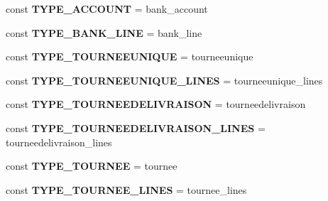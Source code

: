 \begin{DoxyCompactItemize}
\item 
\mbox{\label{classCategorie_a8236dc4a2c1114ebf623eaa7e4b368e8}} 
const {\bfseries T\+Y\+P\+E\+\_\+\+A\+C\+C\+O\+U\+NT} = \textquotesingle{}bank\+\_\+account\textquotesingle{}
\item 
\mbox{\label{classCategorie_accf800db21d78867b251658918074f49}} 
const {\bfseries T\+Y\+P\+E\+\_\+\+B\+A\+N\+K\+\_\+\+L\+I\+NE} = \textquotesingle{}bank\+\_\+line\textquotesingle{}
\item 
\mbox{\label{classCategorie_acbd5e8e1d8f01b07a035a882a1c1a5dd}} 
const {\bfseries T\+Y\+P\+E\+\_\+\+T\+O\+U\+R\+N\+E\+E\+U\+N\+I\+Q\+UE} = \textquotesingle{}tourneeunique\textquotesingle{}
\item 
\mbox{\label{classCategorie_ab4f1670575412e79aeb0875db6edccc5}} 
const {\bfseries T\+Y\+P\+E\+\_\+\+T\+O\+U\+R\+N\+E\+E\+U\+N\+I\+Q\+U\+E\+\_\+\+L\+I\+N\+ES} = \textquotesingle{}tourneeunique\+\_\+lines\textquotesingle{}
\item 
\mbox{\label{classCategorie_a130ffff40455632cb26d6fd20d403ab5}} 
const {\bfseries T\+Y\+P\+E\+\_\+\+T\+O\+U\+R\+N\+E\+E\+D\+E\+L\+I\+V\+R\+A\+I\+S\+ON} = \textquotesingle{}tourneedelivraison\textquotesingle{}
\item 
\mbox{\label{classCategorie_ab6d8714c95e4c3eabba81ce7060b7297}} 
const {\bfseries T\+Y\+P\+E\+\_\+\+T\+O\+U\+R\+N\+E\+E\+D\+E\+L\+I\+V\+R\+A\+I\+S\+O\+N\+\_\+\+L\+I\+N\+ES} = \textquotesingle{}tourneedelivraison\+\_\+lines\textquotesingle{}
\item 
\mbox{\label{classCategorie_aeb222a395e4e7e44b47ae55c773216e9}} 
const {\bfseries T\+Y\+P\+E\+\_\+\+T\+O\+U\+R\+N\+EE} = \textquotesingle{}tournee\textquotesingle{}
\item 
\mbox{\label{classCategorie_a24af51b2e3215e61ddb0a26246b93ce8}} 
const {\bfseries T\+Y\+P\+E\+\_\+\+T\+O\+U\+R\+N\+E\+E\+\_\+\+L\+I\+N\+ES} = \textquotesingle{}tournee\+\_\+lines\textquotesingle{}
\item 
\mbox{\label{classCategorie_a6d59901efadaea8b474a7a9d628b925a}} 

\end{DoxyCompactItemize}
